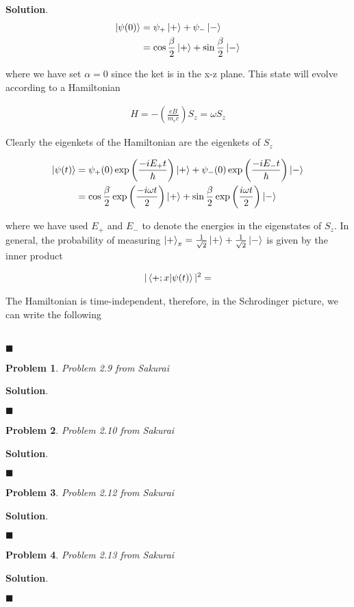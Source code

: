 \documentclass[12pt]{article}
\newtheorem{p}{Problem}
\theoremstyle{definition}
\newenvironment{s}{%
        \begin{trivlist} \item \textbf{Solution}. }{%
            \hspace*{\fill} $\blacksquare$\end{trivlist}}%
\begin{document}
{\begin{s}
\begin{align*}
\ket{\psi(0)} &= \psi_{+}\ket{+} + \psi_{-}\ket{-}\\
&= \cos{\frac{\beta}{2}}\ket{+} + \sin{\frac{\beta}{2}}\ket{-}\\
\end{align*}

where we have set $\alpha=0$ since the ket is in the x-z plane. This state will evolve according to a Hamiltonian

\begin{align*}
H = -\left(\frac{eB}{m_{e}c}\right)S_{z} = \omega S_{z}
\end{align*}


Clearly the eigenkets of the Hamiltonian are the eigenkets of $S_{z}$

\begin{align*}
\ket{\psi(t)} &= \psi_{+}(0)\exp\left(\frac{-iE_{+}t}{\hbar}\right)\ket{+} + \psi_{-}(0)\exp\left(\frac{-iE_{-}t}{\hbar}\right)\ket{-}\\
&= \cos{\frac{\beta}{2}}\exp\left(\frac{-i\omega t}{2}\right)\ket{+} + \sin{\frac{\beta}{2}}\exp\left(\frac{i\omega t}{2}\right)\ket{-}
\end{align*}

where we have used $E_{+}$ and $E_{-}$ to denote the energies in the eigenstates of $S_{z}$. In general, the probability of measuring $\ket{+}_{x} = \frac{1}{\sqrt{2}}\ket{+} + \frac{1}{\sqrt{2}}\ket{-}$ is given by the inner product

\begin{align*}
|\bra{+;x}\ket{\psi(t)}|^{2} = 
\end{align*}





The Hamiltonian is time-independent, therefore, in the Schrodinger picture, we can write the following

\begin{align*}
\end{align*}

\end{s}

\begin{p}
Problem 2.9 from Sakurai
\end{p}

\begin{s}

\end{s}

\begin{p}
Problem 2.10 from Sakurai
\end{p}

\begin{s}

\end{s}

\begin{p}
Problem 2.12 from Sakurai
\end{p}

\begin{s}

\end{s}

\begin{p}
Problem 2.13 from Sakurai
\end{p}

\begin{s}

\end{s}
\end{document}
